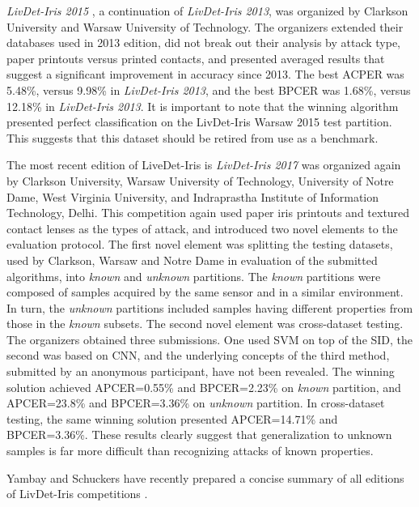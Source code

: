 \documentclass[format=acmsmall, review=false, timestamp=false]{acmart}
\begin{document}
{\it LivDet-Iris 2015} \cite{Yambay_ISBA_2017}, a continuation of {\it LivDet-Iris 2013}, was organized by Clarkson University and Warsaw University of Technology. The organizers extended their databases used in 2013 edition{,} did not break out their analysis by attack type, paper printouts versus printed contacts, and presented averaged results that suggest a significant improvement in accuracy since 2013. The best ACPER was 5.48\%, versus 9.98\% in {\it LivDet-Iris 2013}, and the best BPCER was 1.68\%, versus 12.18\% in {\it LivDet-Iris 2013}. It is important to note that the winning algorithm presented perfect classification on the {\sf LivDet-Iris Warsaw 2015} test partition. This suggests that this dataset should be retired from use as a benchmark.

The most recent edition of LiveDet-Iris is {\it LivDet-Iris 2017} \cite{Yambay_IJCB_2017} was organized again by Clarkson University, Warsaw University of Technology, University of Notre Dame, West Virginia University, and Indraprastha Institute of Information Technology, Delhi. This competition again used paper iris printouts and textured contact lenses as the types of attack, and introduced two novel elements to the evaluation protocol. The first novel element was splitting the testing datasets, used by Clarkson, Warsaw and Notre Dame in evaluation of the submitted algorithms, into {\it known} and {\it unknown} partitions. The {\it known} partitions were composed of samples acquired by the same sensor and in a similar environment. In turn, the {\it unknown} partitions included samples having different properties from those in the {\it known} subsets. The second novel element was cross-dataset testing. The organizers obtained three submissions. One used SVM on top of the SID, the second was based on CNN, and the underlying concepts of the third method, submitted by an anonymous participant, have not been revealed. The winning solution achieved APCER=0.55\% and BPCER=2.23\% on {\it known} partition, and APCER=23.8\% and BPCER=3.36\% on {\it unknown} partition. In cross-dataset testing, the same winning solution presented APCER=14.71\% and BPCER=3.36\%. These results clearly suggest that generalization to unknown samples is far more difficult than recognizing attacks of known properties.

{Yambay and Schuckers have recently prepared a concise summary of all editions of LivDet-Iris competitions \cite{Yambay_PAD_Handbook_2018}.} 



\end{document}
